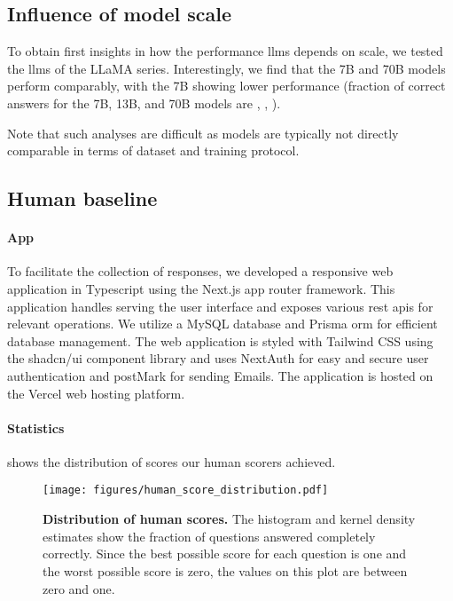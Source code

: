 \subsection{Influence of model scale}
To obtain first insights in how the performance \glspl{llm} depends on scale, we tested the \glspl{llm} of the LLaMA series. 
Interestingly, we find that the 7B and 70B models perform comparably, with the 7B showing lower performance (fraction of correct answers for the 7B, 13B, and 70B models are , , ).

Note that such analyses are difficult as models are typically not directly comparable in terms of dataset and training protocol.\autocite{biderman2023pythia}

\subsection{Human baseline}
\paragraph{App} To facilitate the collection of responses, we developed a responsive web application in Typescript using the Next.js\autocite{nextjs} app router framework.
This application handles serving the user interface and exposes various \gls{rest} \glspl{api} for relevant operations.
We utilize a MySQL\autocite{mysql} database and Prisma \gls{orm}\autocite{prisma} for efficient database management.
The web application is styled with Tailwind CSS\autocite{tailwindcss} using the shadcn/ui component library and uses NextAuth\autocite{nextauth} for easy and secure user authentication and postMark for sending Emails.
The application is hosted on the Vercel web hosting platform.


\paragraph{Statistics}
 shows the distribution of scores our human scorers achieved.

\begin{figure}[htb]
    \centering
    \texttt{[image: figures/human\_score\_distribution.pdf]}
    \label{fig:human_score_distribution}
    \caption{\textbf{Distribution of human scores.} The histogram and kernel density estimates show the fraction of questions answered completely correctly.
    Since the best possible score for each question is one and the worst possible score is zero, the values on this plot are between zero and one.}
\end{figure}

